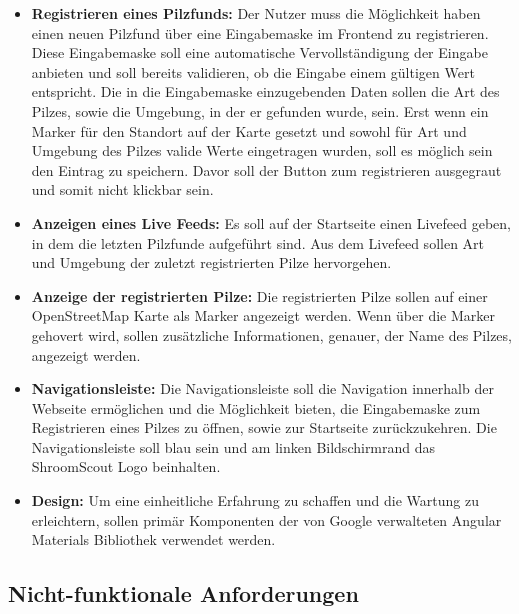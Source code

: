 \begin{itemize}

	\item \textbf{Registrieren eines Pilzfunds:}
	      Der Nutzer muss die Möglichkeit haben einen neuen Pilzfund über eine Eingabemaske im Frontend zu registrieren. Diese Eingabemaske soll eine
	      automatische Vervollständigung der Eingabe anbieten und soll bereits validieren, ob die Eingabe einem gültigen Wert entspricht. Die in die
	      Eingabemaske einzugebenden Daten sollen die Art des Pilzes, sowie die Umgebung, in der er gefunden wurde, sein. Erst wenn ein Marker für den
	      Standort auf der Karte gesetzt und sowohl für Art und Umgebung des Pilzes valide Werte eingetragen wurden, soll es möglich sein den Eintrag zu
	      speichern. Davor soll der Button zum registrieren ausgegraut und somit nicht klickbar sein.

	\item \textbf{Anzeigen eines Live Feeds:}
	      Es soll auf der Startseite einen Livefeed geben, in dem die letzten Pilzfunde aufgeführt sind. Aus dem Livefeed sollen Art und Umgebung der
	      zuletzt registrierten Pilze hervorgehen.

	\item \textbf{Anzeige der registrierten Pilze:}
	      Die registrierten Pilze sollen auf einer OpenStreetMap Karte als Marker angezeigt werden. Wenn über die Marker gehovert wird, sollen zusätzliche
	      Informationen, genauer, der Name des Pilzes, angezeigt werden.

	\item \textbf{Navigationsleiste:}
	      Die Navigationsleiste soll die Navigation innerhalb der Webseite ermöglichen und die Möglichkeit bieten, die Eingabemaske zum Registrieren eines
	      Pilzes zu öffnen, sowie zur Startseite zurückzukehren. Die Navigationsleiste soll blau sein und am linken Bildschirmrand das ShroomScout Logo
	      beinhalten.

	\item \textbf{Design:}
	      Um eine einheitliche Erfahrung zu schaffen und die Wartung zu erleichtern, sollen primär Komponenten der von Google verwalteten Angular Materials
	      Bibliothek verwendet werden.

\end{itemize}

\subsection{Nicht-funktionale Anforderungen}

